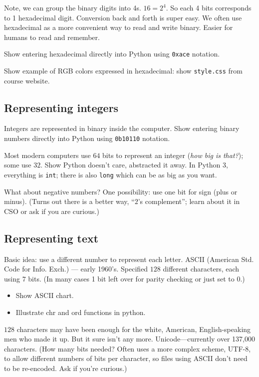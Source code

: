 \documentclass{article}
\begin{document}
Note, we can group the binary digits into 4s.  $16 = 2^4$.  So each 4
bits corresponds to 1 hexadecimal digit.  Conversion back and forth is
super easy.  We often use hexadecimal as a more convenient way to read
and write binary.  Easier for humans to read and remember.

Show entering hexadecimal directly into Python using \verb|0xace|
notation.

Show example of RGB colors expressed in hexadecimal: show
\verb|style.css| from course website.

\subsection*{Representing integers}

Integers are represented in binary inside the computer.  Show entering
binary numbers directly into Python using \verb|0b10110| notation.

Most modern computers use $64$ bits to represent an integer (\emph{how
  big is that?}); some use $32$. Show Python doesn't care, abstracted
it away.  In Python 3, everything is \texttt{int}; there is also
\texttt{long} which can be as big as you want.

What about negative numbers?  One possibility: use one bit for sign
(plus or minus).  (Turns out there is a better way, ``$2$'s
complement''; learn about it in CSO or ask if you are curious.)

\subsection*{Representing text}

Basic idea: use a different number to represent each letter.  ASCII
(American Std. Code for Info. Exch.) --- early 1960's.  Specified
$128$ different characters, each using $7$ bits.  (In many cases 1 bit
left over for parity checking or just set to $0$.)
\begin{itemize}
\item Show ASCII chart.
\item Illustrate chr and ord functions in python.
\end{itemize}
$128$ characters may have been enough for the white, American,
English-speaking men who made it up.  But it sure isn't any more.
Unicode---currently over 137,000 characters. (How many bits needed?
Often uses a more complex scheme, UTF-8, to allow different numbers of
bits per character, so files using ASCII don't need to be re-encoded.
Ask if you're curious.)
\end{document}

